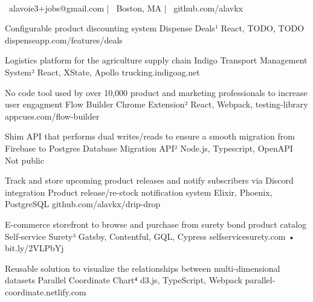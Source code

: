 \documentclass[]{awesome-cv}
\begin{document}
    
\begin{center}
	  \\
	\vspace{2mm}
	{\faEnvelope\ alavoie3+jobs@gmail.com} | {\faMapMarker\ Boston, MA} | {\faLink\ github.com/alavkx}
\end{center}

\begin{cventries}
	\vspace{-6mm}
	\cventry
	{Configurable product discounting system}
	{Dispense Deals¹}
	{React, TODO, TODO}
	{dispenseapp.com/features/deals}
	{}

	\cventry
	{Logistics platform for the agriculture supply chain}
	{Indigo Transport Management System²}
	{React, XState, Apollo}
	{trucking.indigoag.net}
	{}
	
	\vspace{-6mm}
	\cventry
	{No code tool used by over 10,000 product and marketing professionals to increase user engagment}
	{Flow Builder Chrome Extension²}
	{React, Webpack, testing-library}
	{appcues.com/flow-builder}
	{}
	
	\vspace{-6mm}
	\cventry
	{Shim API that performs dual writes/reads to ensure a smooth migration from Firebase to Postgres}
	{Database Migration API²}
	{Node.js, Typescript, OpenAPI}
	{Not public}
	{}
	
	\vspace{-6mm}
	\cventry
	{Track and store upcoming product releases and notify subscribers via Discord integration}
	{Product release/re-stock notification system}
	{Elixir, Phoenix, PostgreSQL}
	{github.com/alavkx/drip-drop}
	{}
	
	\vspace{-6mm}
	\cventry
	{E-commerce storefront to browse and purchase from surety bond product catalog}
	{Self-service Surety³}
	{Gatsby, Contentful, GQL, Cypress}
	{selfservicesurety.com • bit.ly/2VLPbYj}
	{}

	\vspace{-6mm}
	\cventry
	{Reusable solution to visualize the relationships between multi-dimensional datasets}
	{Parallel Coordinate Chart⁴}
	{d3.js, TypeScript, Webpack}
	{parallel-coordinate.netlify.com}
	{}
	
	\vspace{-6mm}
\end{cventries}
\end{document}
